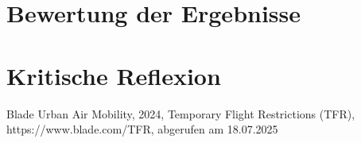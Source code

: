 \documentclass[a4paper,12pt]{article}
\begin{document}
\section{Bewertung der Ergebnisse}
\newpage
\section{Kritische Reflexion}


\newpage
{}
\begin{thebibliography}{9}  %
Blade Urban Air Mobility, 2024, Temporary Flight Restrictions (TFR), https://www.blade.com/TFR, abgerufen am 18.07.2025


\end{thebibliography}
\end{document}
